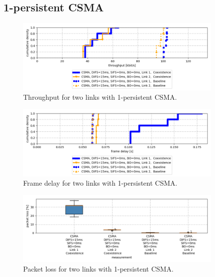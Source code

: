 \subsection{1-persistent CSMA}

\begin{figure}[tb]
	\label{fig:results-difs-only-dbl-throughput}
	\begin{center}
		\includegraphics[width=0.9\textwidth]{pictures/results/same_combinations/difs_only/throughput_cdf}
	\end{center}
	\caption{Throughput for two links with 1-persistent CSMA.}
\end{figure}

\begin{figure}[tb]
	\label{fig:results-difs-only-dbl-frame-delay}
	\begin{center}
		\includegraphics[width=0.9\textwidth]{pictures/results/same_combinations/difs_only/frame_delay_cdf}
	\end{center}
	\caption{Frame delay for two links with 1-persistent CSMA.}
\end{figure}

\begin{figure}[tb]
	\label{fig:results-difs-only-dbl-packet-loss}
	\begin{center}
		\includegraphics[width=0.9\textwidth]{pictures/results/same_combinations/difs_only/packet_loss_boxplot}
	\end{center}
	\caption{Packet loss for two links with 1-persistent CSMA.}
\end{figure}


